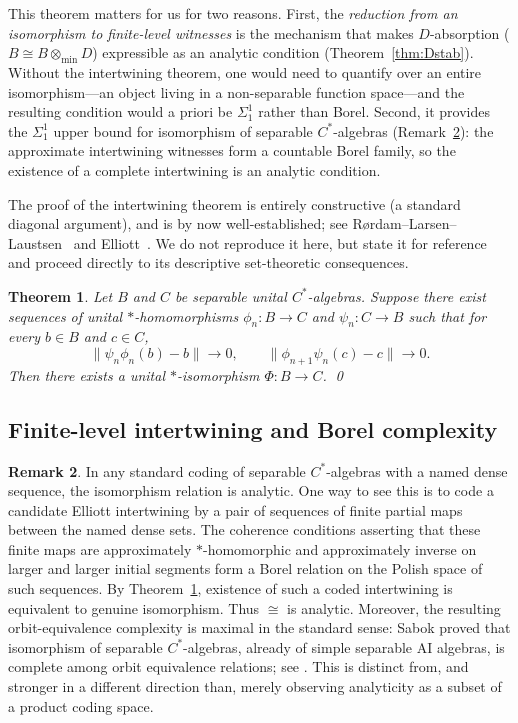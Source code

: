\documentclass[12pt,fleqn,a4paper]{amsart}
\numberwithin{equation}{section}
\newtheorem{theorem}{Theorem}[section]
\theoremstyle{definition}
\newtheorem{remark}[theorem]{Remark}
\begin{document}
This theorem matters for us for two reasons.  First, the
\emph{reduction from an isomorphism to finite-level witnesses} is the mechanism
that makes $D$-absorption ($B\cong B\otimes_{\min}D$) expressible as an analytic condition
(Theorem~\ref{thm:Dstab}).  Without the intertwining theorem, one
would need to quantify over an entire isomorphism---an object living in a
non-separable function space---and the resulting condition would a priori be
$\Sigma^1_1$ rather than Borel.
Second, it provides the $\Sigma^1_1$ upper bound for isomorphism of
separable $C^*$-algebras (Remark~\ref{rem:isom-analytic}): the approximate
intertwining witnesses form a countable Borel family, so the existence of a
complete intertwining is an analytic condition.

The proof of the intertwining theorem is entirely constructive (a standard
diagonal argument), and is by now well-established; see
R\o rdam--Larsen--Laustsen~\cite[Theorem~2.3.3]{RordamLarsenLaustsen}
and Elliott~\cite{Elliott1976}.
We do not reproduce it here, but state it for reference and proceed
directly to its descriptive set-theoretic consequences.

\begin{theorem}
\label{thm:elliott-intertwining}
Let $B$ and $C$ be separable unital $C^*$-algebras.  Suppose there exist sequences of
unital $*$-homomorphisms $\phi_n:B\to C$ and $\psi_n:C\to B$ such that for every
$b\in B$ and $c\in C$,
\[
\|\psi_n\phi_n(b)-b\|\to 0,
\qquad
\|\phi_{n+1}\psi_n(c)-c\|\to 0.
\]
Then there exists a unital $*$-isomorphism $\Phi:B\to C$.  \qed
\end{theorem}

\subsection{Finite-level intertwining and Borel complexity}

\begin{remark}\label{rem:isom-analytic}
In any standard coding of separable $C^*$-algebras with a named dense sequence,
the isomorphism relation is analytic.  One way to see this is to code a candidate
Elliott intertwining by a pair of sequences of finite partial maps between the
named dense sets.  The coherence conditions asserting that these finite maps are
approximately $*$-homomorphic and approximately inverse on larger and larger
initial segments form a Borel relation on the Polish space of such sequences.
By Theorem~\ref{thm:elliott-intertwining}, existence of such a coded intertwining
is equivalent to genuine isomorphism.  Thus $\cong$ is analytic.
Moreover, the resulting orbit-equivalence complexity is maximal in the standard
sense: Sabok proved that isomorphism of separable $C^*$-algebras, already of simple
separable AI algebras, is complete among orbit equivalence relations; see
\cite{SabokCompleteness}.  This is distinct from, and stronger in a different
direction than, merely observing analyticity as a subset of a product coding space.
\end{remark}
\end{document}
